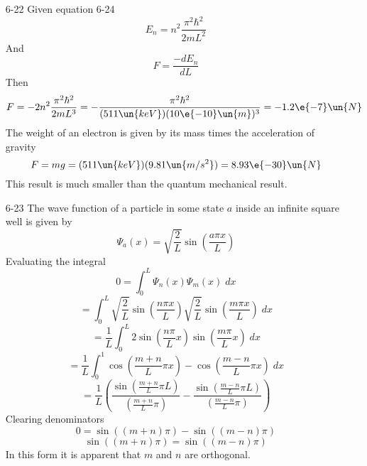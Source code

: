 \documentclass[]{2620hw}
\begin{document}
\begin{enumerate}
\begin{enumerate}
\end{enumerate}

\item [6-22]
	Given equation 6-24
	\[
		E_n = n^2 \frac{\pi^2 \hbar^2}{2mL^2}
	\]
	And 
	\[
		F = \frac{-dE_n}{dL}
	\]
	Then
	\[
		F = -2 n^2 \frac{\pi^2 \hbar^2}{2mL^3} = -\frac{\pi^2 \hbar^2}{(511\un{keV})(10\e{-10}\un{m})^3} = -1.2 \e{-7}\un{N}
	\]
	The weight of an electron is given by its mass times the acceleration of gravity
	\[
		F = mg = (511\un{keV})(9.81\un{m/s^2}) = 8.93\e{-30}\un{N} 
	\]
	This result is much smaller than the quantum mechanical result.

\item [6-23]
The wave function of a particle in some state $a$ inside an infinite square well is given by 
\[
	\Psi_a(x) =\sqrt{\frac{2}{L}} \sin{\left( \frac{a\pi x}{L} \right)}
\]
Evaluating the integral
\[
	0 = \int_0^L \Psi_n(x) \Psi_m(x) \; dx
\]
\[
	= \int_0^L \sqrt{\frac{2}{L}} \sin{\left( \frac{n\pi x}{L} \right)} \sqrt{\frac{2}{L}} \sin{\left( \frac{m\pi x}{L} \right)} \; dx
\]
\[
	= \frac{1}{L}\int_0^L 2\sin{\left( \frac{n\pi}{L}x \right)}\sin{\left( \frac{m\pi}{L}x \right)} \; dx
\]
\[
	= \frac{1}{L} \int_0^1 \cos{ \left( \frac{m+n}{L} \pi x \right) } - \cos{ \left( \frac{m-n}{L} \pi x \right) } \; dx
\]
\[
	= \frac{1}{L}\left( \frac{\sin{\left( \frac{m+n}{L} \pi L \right)}}{\left( \frac{m+n}{L} \pi \right)} - \frac{\sin{\left( \frac{m-n}{L} \pi L \right)}}{\left( \frac{m-n}{L} \pi \right)} \right)
\]
Clearing denominators
\[
	0 = \sin{((m+n)\pi)} - \sin{((m-n)\pi)}
\]
\[
	\sin{((m+n)\pi)} = \sin{((m-n)\pi)}
\]
In this form it is apparent that $m$ and $n$ are orthogonal.

\end{enumerate}
\end{document}
